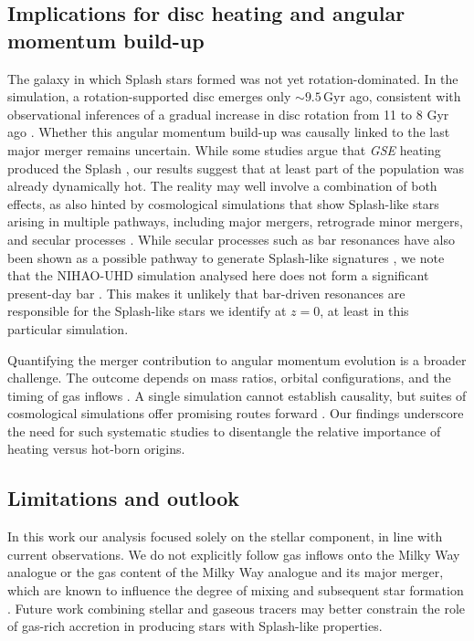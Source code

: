 \documentclass[fleqn,usenatbib]{mnras}
\begin{document}
\subsection{Implications for disc heating and angular momentum build-up}

The galaxy in which Splash stars formed was not yet rotation-dominated. In the simulation, a rotation-supported disc emerges only $\sim 9.5\,\mathrm{Gyr}$ ago, consistent with observational inferences of a gradual increase in disc rotation from 11 to 8 Gyr ago \citep[e.g.][]{MCM2013}. Whether this angular momentum build-up was causally linked to the last major merger remains uncertain. While some studies argue that \textit{GSE} heating produced the Splash \citep{Bonaca2020, DiMatteo2019}, our results suggest that at least part of the population was already dynamically hot. The reality may well involve a combination of both effects, as also hinted by cosmological simulations that show Splash-like stars arising in multiple pathways, including major mergers, retrograde minor mergers, and secular processes \citep{Quinn1993, Purcell2010, Villalobos2008, Villalobos2009, Dillamore2023, Dillamore2025, Kisku2025}. While secular processes such as bar resonances have also been shown as a possible pathway to generate Splash-like signatures \citep{Dillamore2022,Dillamore2023}, we note that the NIHAO-UHD simulation analysed here does not form a significant present-day bar \citep{Buder2025}. This makes it unlikely that bar-driven resonances are responsible for the Splash-like stars we identify at $z=0$, at least in this particular simulation.

Quantifying the merger contribution to angular momentum evolution is a broader challenge. The outcome depends on mass ratios, orbital configurations, and the timing of gas inflows \citep[e.g.][]{Lagos2017, Lagos2018}. A single simulation cannot establish causality, but suites of cosmological simulations offer promising routes forward \citep{Pillepich2019, SotilloRamos2022}. Our findings underscore the need for such systematic studies to disentangle the relative importance of heating versus hot-born origins.

\subsection{Limitations and outlook}

In this work our analysis focused solely on the stellar component, in line with current observations. We do not explicitly follow gas inflows onto the Milky Way analogue or the gas content of the Milky Way analogue and its major merger, which are known to influence the degree of mixing and subsequent star formation \citep[e.g.][]{Cooper2015, Agertz2021, Renaud2021b, Buck2023, TepperGarcia2024}. Future work combining stellar and gaseous tracers may better constrain the role of gas-rich accretion in producing stars with Splash-like properties.
\end{document}
